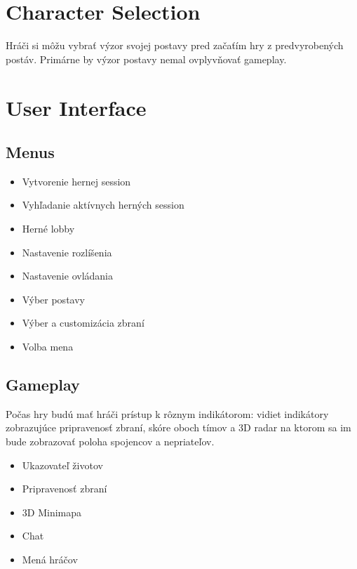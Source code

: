 \documentclass[a4paper]{report}
\begin{document}
\section{Character Selection}
 Hráči si môžu vybrať výzor svojej postavy pred začaťím hry z predvyrobených postáv. Primárne by výzor postavy nemal ovplyvňovať gameplay. 

\section{User Interface}
\subsection{Menus}
\begin{itemize}
  \item Vytvorenie hernej session
  \item Vyhľadanie aktívnych herných session
  \item Herné lobby
  \item Nastavenie rozlíšenia
  \item Nastavenie ovládania
  \item Výber postavy
  \item Výber a customizácia zbraní
  \item Volba mena
\end{itemize}
 
\subsection{Gameplay}
Počas hry budú mať hráči prístup k rôznym indikátorom: vidiet indikátory zobrazujúce pripravenosť zbraní, skóre oboch tímov a 3D radar na ktorom sa im bude zobrazovať poloha spojencov a nepriateľov.
\begin{itemize}
  \item Ukazovateľ životov
  \item Pripravenosť zbraní
  \item 3D Minimapa
  \item Chat
  \item Mená hráčov
\end{itemize} 
\end{document}
